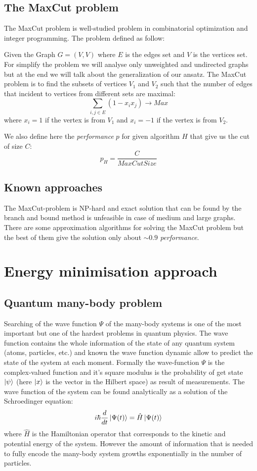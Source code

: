 \documentclass{article}
\begin{document}
\subsection{The MaxCut problem}
The MaxCut problem is well-studied problem in combinatorial optimization and integer programming. The problem defined as follow:

Given the Graph $G = (V, V)$ where $E$ is the edges set and $V$ is the vertices set. For simplify the problem we will analyse only unweighted and undirected graphs but at the end we will talk about the generalization of our ansatz. The MaxCut problem is to find the subsets of vertices $V_1$ and $V_2$ such that the number of edges that incident to vertices from different sets are maximal:
$$\sum_{i,j \in E} (1 - x_ix_j) \to Max$$
where $x_i = 1$ if the vertex is from $V_1$ and $x_i = -1$ if the vertex is from $V_2$.

We also define here the \textit{performance} $p$ for given algorithm $H$ that give us the cut of size $C$:
$$p_H = \frac{C}{MaxCutSize}$$

\subsection{Known approaches}
The MaxCut-problem is NP-hard and exact solution that can be found by the branch and bound method is unfeasible in case of medium and large graphs. There are some approximation algorithms for solving the MaxCut problem but the best of them give the solution only about $\sim 0.9$ \textit{performance}\cite{MaxCutClassic}.

\section{Energy minimisation approach}
\subsection{Quantum many-body problem}
Searching of the wave function $\Psi$ of the many-body systems is one of the most important but one of the hardest problems in quantum physics. The wave function contains the whole information of the state of any quantum system (atoms, particles, etc.) and known the wave function dynamic allow to predict the state of the system at each moment. Formally the wave-function $\Psi$ is the complex-valued function and it's square modulus is the probability of get state $\ket{\psi}$ (here $\ket{x}$ is the vector in the Hilbert space) as result of measurements. The wave function of the system can be found analytically as a solution of the Schroedinger equation: $$i\hbar\frac{d}{dt}\ket{\Psi(t)} = \hat{H}\ket{\Psi(t)}$$
where $\hat{H}$ is the Hamiltonian operator that corresponds to the kinetic and potential energy of the system. However the amount of information that is needed to fully encode the many-body system growths exponentially in the number of particles.
\end{document}
